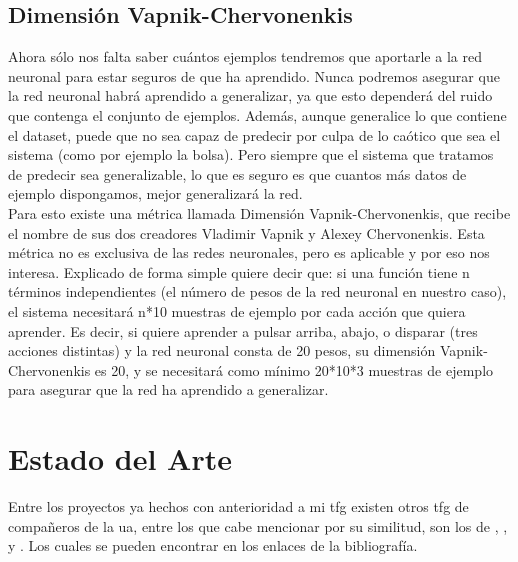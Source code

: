 \subsection{Dimensión Vapnik-Chervonenkis}
Ahora sólo nos falta saber cuántos ejemplos tendremos que aportarle a la red neuronal para estar seguros de que ha aprendido. Nunca podremos asegurar que la red neuronal habrá aprendido a generalizar, ya que esto dependerá del ruido que contenga el conjunto de ejemplos. Además, aunque generalice lo que contiene el dataset, puede que no sea capaz de predecir por culpa de lo caótico que sea el sistema (como por ejemplo la bolsa). Pero siempre que el sistema que tratamos de predecir sea generalizable, lo que es seguro es que cuantos más datos de ejemplo dispongamos, mejor generalizará la red. 
\\
Para esto existe una métrica llamada Dimensión Vapnik-Chervonenkis, que recibe el nombre de sus dos creadores Vladimir Vapnik y Alexey Chervonenkis. Esta métrica no es exclusiva de las redes neuronales, pero es aplicable y por eso nos interesa. Explicado de forma simple quiere decir que: si una función tiene n términos independientes (el número de pesos de la red neuronal en nuestro caso), el sistema necesitará n*10 muestras de ejemplo por cada acción que quiera aprender. Es decir, si quiere aprender a pulsar arriba, abajo, o disparar (tres acciones distintas) y la red neuronal consta de 20 pesos, su dimensión Vapnik-Chervonenkis es 20, y se necesitará como mínimo 20*10*3 muestras de ejemplo para asegurar que la red ha aprendido a generalizar.

\section{Estado del Arte}
Entre los proyectos ya hechos con anterioridad a mi \gls{tfg} existen otros \gls{tfg} de compañeros de la \gls{ua}, entre los que cabe mencionar por su similitud, son los de \cite{tfg-ia-1}, \cite{tfg-ia-2}, \cite{tfg-ia-3} y \cite{tfg-ia-4}. Los cuales se pueden encontrar en los enlaces de la bibliografía.

